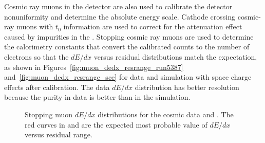 Cosmic ray muons in the  detector are also used to calibrate the detector nonuniformity and determine the absolute energy scale. Cathode crossing cosmic-ray muons with $t_{0}$ information are used to correct for the attenuation effect caused by impurities in the \lar. Stopping cosmic ray muons are used to determine the calorimetry constants that convert the calibrated  counts to the number of electrons so that the $dE/dx$ versus residual distributions match the expectation, as shown in Figures~\ref{fig:muon_dedx_resrange_run5387} and~\ref{fig:muon_dedx_resrange_sce} for  data and  simulation with space charge effects after calibration. The data $dE/dx$ distribution has better resolution because the purity in data is better than in the simulation. 

\begin{figure}[!ht]
\centering
{}
\caption[Stopping muon $dE/dx$ distributions for the  cosmic data and ]{Stopping muon $dE/dx$ distributions for the  cosmic data and . The red curves in \protect{} and \protect{} are the expected most probable value of $dE/dx$ versus residual range.}
\label{fig:pandora_protodune_mu}
\end{figure}

